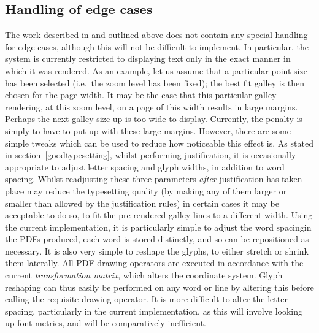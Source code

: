 \subsection{Handling of edge cases}
\label{edgecases}
The work described in \cite{Pinkney2011} and outlined above does not contain any special handling
for edge cases, although this will not be difficult to implement. In particular, the system is
currently restricted to displaying text only in the exact manner in which it was rendered. As an
example, let us assume that a particular point size has been selected (i.e.\ the zoom level has been
fixed); the best fit galley is then chosen for the page width. It may be the case that this
particular galley rendering, at this zoom level, on a page of this width results in large margins.
Perhaps the next galley size up is too wide to display. Currently, the penalty is simply to have to
put up with these large margins. However, there are some simple tweaks which can be used to reduce
how noticeable this effect is. As stated in section~\ref{goodtypesetting}, whilst performing
justification, it is occasionally appropriate to adjust letter spacing and glyph widths, in addition
to word spacing. Whilst readjusting these three
parameters \emph{after} justification has taken place may reduce the typesetting quality (by making
any of them larger or smaller than allowed by the justification rules) in certain cases it may be
acceptable to do so, to fit the pre-rendered galley lines to a different width. Using the current
implementation, it is particularly simple to adjust the word spacing\ed in the PDFs produced, each
word is stored distinctly, and so can be repositioned as necessary. It is also very simple to
reshape the glyphs, to either stretch or shrink them laterally. All PDF drawing operators are
executed in accordance with the current \emph{transformation matrix}, which alters the coordinate
system\cite{Adobe2001}. Glyph reshaping can thus easily be performed on any word or line by altering
this before calling the requisite drawing operator. It is more difficult to alter the letter
spacing, particularly in the current implementation, as this will involve looking up font metrics,
and will be comparatively inefficient.


